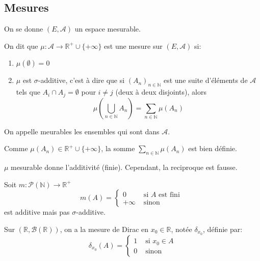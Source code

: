 
\subsection{Mesures}

On se donne $(E, \mathscr{A})$ un espace mesurable.

\begin{definition}[Mesure]
	On dit que $\mu : \mathscr{A} \to \mathbb{R}^+\cup \{+\infty\}$ est une mesure sur $(E, \mathscr{A})$ si:
	\begin{enumerate}
		\item $\mu(\emptyset) = 0$
		\item $\mu$ est $\sigma$-additive, c'est à dire que si $(A_n)_{n \in \mathbb{N}}$ est une suite d'éléments de $\mathscr{A}$
		      tels que $A_i \cap A_j = \emptyset$ pour $i \neq j$ (deux à deux disjoints), alors
		      \begin{equation*}
			      \mu\left(\bigcup\limits_{n \in \mathbb{N}} A_n\right) = \sum\limits_{n \in \mathbb{N}} \mu(A_n)
		      \end{equation*}
	\end{enumerate}
\end{definition}

\begin{remarque}
	On appelle meurables les ensembles qui sont dans $\mathscr{A}$.
\end{remarque}

\begin{remarque}
	Comme $\mu (A_n) \in \mathbb{R}^+ \cup \{+\infty\}$, la somme $\sum\limits_{n \in \mathbb{N}} \mu(A_n)$ est bien définie.
\end{remarque}

\begin{remarque}
	$\mu$ mesurable donne l'additivité (finie). Cependant, la reciproque est fausse.
	\begin{example}
		Soit $m: \mathscr{P}(\mathbb{N}) \to \mathbb{R}^+$
		\begin{equation*}
			m(A) = \left\{
			\begin{array}{ll}
				0       & \text{ si } A \text{ est fini } \\
				+\infty & \text{ sinon }
			\end{array}
			\right.
		\end{equation*}
		est additive mais pas $\sigma$-additive.
	\end{example}
\end{remarque}

\begin{example}
	Sur $(\mathbb{R}, \mathscr{B}(\mathbb{R}))$, on a la mesure de
	Dirac en $x_0 \in \mathbb{R}$, notée $\delta_{x_0}$, définie par:
	\begin{equation*}
		\delta_{x_0}(A) = \left\{
		\begin{array}{ll}
			1 & \text{ si } x_0 \in A \\
			0 & \text{ sinon }
		\end{array}
		\right.
	\end{equation*}
\end{example}

